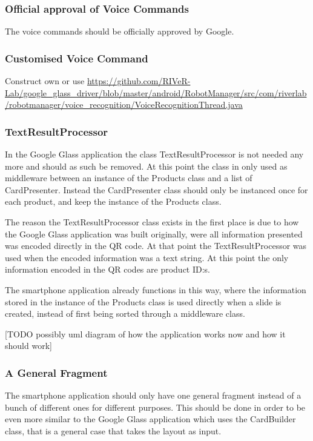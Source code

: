 \subsubsection{Official approval of Voice Commands}
The voice commands should be officially approved by Google.

\subsubsection{Customised Voice Command}
Construct own or use \url{https://github.com/RIVeR-Lab/google_glass_driver/blob/master/android/RobotManager/src/com/riverlab/robotmanager/voice_recognition/VoiceRecognitionThread.java}

\subsubsection{TextResultProcessor}
In the Google Glass application the class TextResultProcessor is not needed any more and should as such be removed. At this point the class in only used as middleware between an instance of the Products class and a list of CardPresenter. Instead the CardPresenter class should only be instanced once for each product, and keep the instance of the Products class.

The reason the TextResultProcessor class exists in the first place is due to how the Google Glass application was built originally, were all information presented was encoded directly in the QR code. At that point the TextResultProcessor was used when the encoded information was a text string. At this point the only information encoded in the QR codes are product ID:s.

The smartphone application already functions in this way, where the information stored in the instance of the Products class is used directly when a slide is created, instead of first being sorted through a middleware class.

[TODO possibly uml diagram of how the application works now and how it should work]

\subsubsection{A General Fragment}
The smartphone application should only have one general fragment instead of a bunch of different ones for different purposes. This should be done in order to be even more similar to the Google Glass application which uses the CardBuilder class, that is a general case that takes the layout as input.